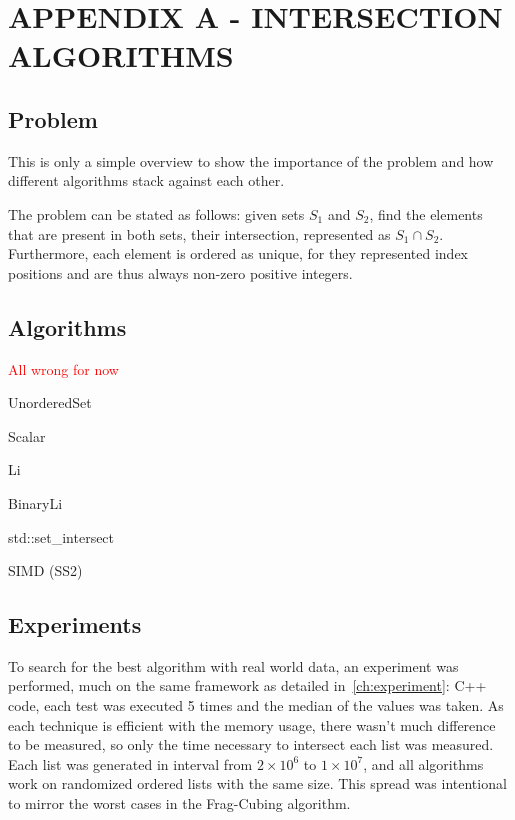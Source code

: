 
\hypertarget{appendix:a}{} %
\renewcommand{\thechapter}{}%
\chapter{APPENDIX A - INTERSECTION ALGORITHMS}
\label{ap:a}
\renewcommand{\thechapter}{A}

\section{Problem}\label{ap:a:problem}

This is only a simple overview to show the importance of the problem and how different algorithms stack against each other.

The problem can be stated as follows: given sets $S_1$ and $S_2$, find the elements that are present in both sets, their intersection, represented as $S_1 \cap S_2$.
Furthermore, each element is ordered as unique, for they represented index positions and are thus always non-zero positive integers.

\section{Algorithms}\label{ap:a:algos}

\textcolor{red}{All wrong for now}

UnorderedSet

Scalar

Li

BinaryLi

std::set\_intersect

SIMD (SS2)


\section{Experiments}\label{ap:a:results}

To search for the best algorithm with real world data, an experiment was performed, much on the same framework as detailed in~\ref{ch:experiment}: C++ code, each test was executed 5 times and the median of the values was taken.
As each technique is efficient with the memory usage, there wasn't much difference to be measured, so only the time necessary to intersect each list was measured.
Each list was generated in interval from $2\times10^6$ to $1\times10^7$, and all algorithms work on randomized ordered lists with the same size.
This spread was intentional to mirror the worst cases in the Frag-Cubing algorithm.

